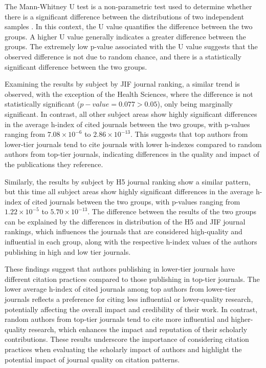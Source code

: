 The Mann-Whitney U test is a non-parametric test used to determine whether
there is a significant difference between the distributions of two independent
samples \cite{mann1947test}. In this context, the U value quantifies the
difference between the two groups. A higher U value generally indicates a
greater difference between the groups. The extremely low p-value associated
with the U value suggests that the observed difference is not due to random
chance, and there is a statistically significant difference between the two
groups.

Examining the results by subject by JIF journal ranking, a similar trend is
observed, with the exception of the Health Sciences, where the difference is
not statistically significant ($p-value = 0.077 > 0.05$), only being marginally
significant. In contrast, all other subject areas show highly significant
differences in the average h-index of cited journals between the two groups,
with p-values ranging from $7.08 \times 10^{-6}$ to $2.86 \times 10^{-13}$.
This suggests that top authors from lower-tier journals tend to cite journals
with lower h-indexes compared to random authors from top-tier journals,
indicating differences in the quality and impact of the publications they
reference.

Similarly, the results by subject by H5 journal ranking show a similar pattern,
but this time all subject areas show highly significant differences in the
average h-index of cited journals between the two groups, with p-values ranging
from $1.22 \times 10^{-5}$ to $5.70 \times 10^{-13}$. The difference between
the results of the two groups can be explained by the differences in
distribution of the H5 and JIF journal rankings, which influences the journals
that are considered high-quality and influential in each group, along with the
respective h-index values of the authors publishing in high and low tier
journals.

These findings suggest that authors publishing in lower-tier journals have
different citation practices compared to those publishing in top-tier journals.
The lower average h-index of cited journals among top authors from lower-tier
journals reflects a preference for citing less influential or lower-quality
research, potentially affecting the overall impact and credibility of their
work. In contrast, random authors from top-tier journals tend to cite more
influential and higher-quality research, which enhances the impact and
reputation of their scholarly contributions. These results underscore the
importance of considering citation practices when evaluating the scholarly
impact of authors and highlight the potential impact of journal quality on
citation patterns.

